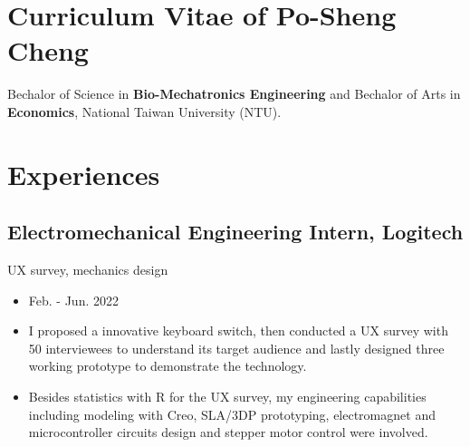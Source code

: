 \documentclass[12pt]{article}
\begin{document}
    \section*{Curriculum Vitae of Po-Sheng Cheng} 
    {\sffamily
    Bechalor of Science in \textbf{Bio-Mechatronics Engineering} and Bechalor of Arts in \textbf{Economics}, National Taiwan University (NTU).
    }
    
    \section*{Experiences
    }
        \subsection*{Electromechanical Engineering Intern, Logitech}
        {\sffamily
        UX survey, mechanics design
        \begin{itemize}
            \item Feb. - Jun. 2022
            \item I proposed a innovative keyboard switch, then conducted a UX survey with 50 interviewees to understand its target audience and lastly designed three working prototype to demonstrate the technology.
            \item Besides statistics with R for the UX survey, my engineering capabilities including modeling with Creo, SLA/3DP prototyping, electromagnet and microcontroller circuits design and stepper motor control were involved.
        \end{itemize}
        }
\end{document}
